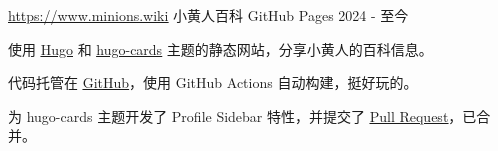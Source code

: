 \begin{cventries}
  \cventry
    {\href{https://www.minions.wiki}{\uline{https://www.minions.wiki}}} %
    {小黄人百科} %
    {GitHub Pages} %
    {2024 - 至今} %
    {
      \begin{cvitems} %
        \item {使用 \href{https://gohugo.io/}{\uline{Hugo}} 和 \href{https://github.com/bul-ikana/hugo-cards}{\uline{hugo-cards}} 主题的静态网站，分享小黄人的百科信息。}
        \item {代码托管在 \href{https://github.com/kugarocks/minions.wiki}{\uline{GitHub}}，使用 GitHub Actions 自动构建，挺好玩的。}
        \item {为 hugo-cards 主题开发了 Profile Sidebar 特性，并提交了 \href{https://github.com/bul-ikana/hugo-cards/pull/28}{\uline{Pull Request}}，已合并。}
      \end{cvitems}
    }

\end{cventries}
